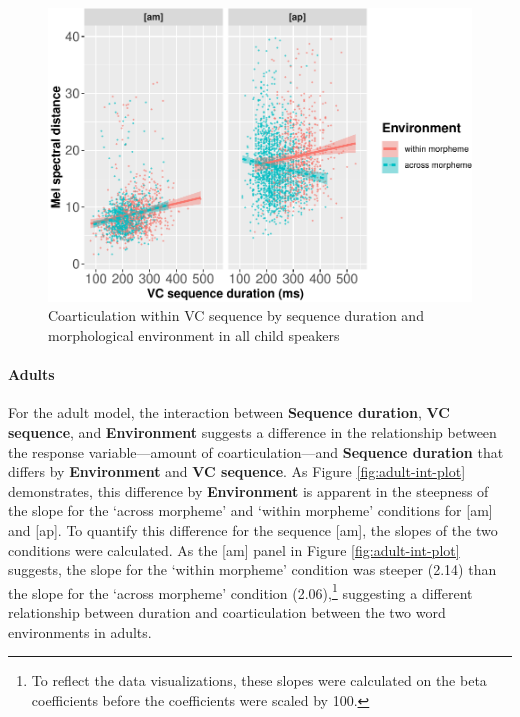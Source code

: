 \documentclass[
]{article}
\begin{document}
\begin{figure}
\centering
\includegraphics{3_ch3_results_files/figure-latex/child-int-plot-1.pdf}
\caption{\label{fig:child-int-plot}Coarticulation within VC sequence by sequence duration and morphological environment in all child speakers}
\end{figure}

\hypertarget{adults}{%
\paragraph{Adults}\label{adults}}

For the adult model, the interaction between \textbf{Sequence duration}, \textbf{VC sequence}, and \textbf{Environment} suggests a difference in the relationship between the response variable---amount of coarticulation---and \textbf{Sequence duration} that differs by \textbf{Environment} and \textbf{VC sequence}. As Figure \ref{fig:adult-int-plot} demonstrates, this difference by \textbf{Environment} is apparent in the steepness of the slope for the `across morpheme' and `within morpheme' conditions for {[}am{]} and {[}ap{]}. To quantify this difference for the sequence {[}am{]}, the slopes of the two conditions were calculated. As the {[}am{]} panel in Figure \ref{fig:adult-int-plot} suggests, the slope for the `within morpheme' condition was steeper (2.14) than the slope for the `across morpheme' condition (2.06),\footnote{To reflect the data visualizations, these slopes were calculated on the beta coefficients before the coefficients were scaled by 100.} suggesting a different relationship between duration and coarticulation between the two word environments in adults.
\end{document}
